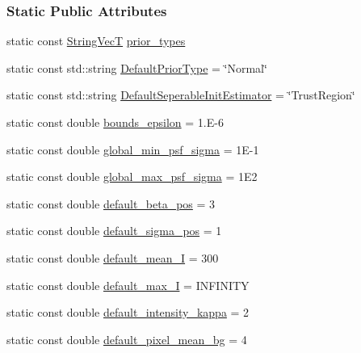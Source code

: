 \subsubsection*{Static Public Attributes}
\begin{DoxyCompactItemize}
\item 
static const \hyperlink{namespacemappel_aae88cf18bccfbb789a6019bcfbbfca68}{String\+VecT} \hyperlink{classmappel_1_1Gauss2DsModel_a9c23ad32b75a80271a0d5ac24138c5ee}{prior\+\_\+types}
\item 
static const std\+::string \hyperlink{classmappel_1_1Gauss2DsModel_ac00cce582449c74c64f624ec85c9e164}{Default\+Prior\+Type} = \char`\"{}Normal\char`\"{}
\item 
static const std\+::string \hyperlink{classmappel_1_1PointEmitterModel_ad8c3dc629d75d22f25855a5f1ba8729f}{Default\+Seperable\+Init\+Estimator} = \char`\"{}Trust\+Region\char`\"{}
\item 
static const double \hyperlink{classmappel_1_1PointEmitterModel_ac987a119137b85a27704b1c40e3fab8c}{bounds\+\_\+epsilon} = 1.\+E-\/6
\item 
static const double \hyperlink{classmappel_1_1PointEmitterModel_a77d0ca98d77cb8b94117ece2a5b182a4}{global\+\_\+min\+\_\+psf\+\_\+sigma} = 1\+E-\/1
\item 
static const double \hyperlink{classmappel_1_1PointEmitterModel_a5e79dba8966c25c4e9c675cd1a2cab70}{global\+\_\+max\+\_\+psf\+\_\+sigma} = 1\+E2
\item 
static const double \hyperlink{classmappel_1_1PointEmitterModel_a9b64c3b4b97ac2805340c0779c71398c}{default\+\_\+beta\+\_\+pos} = 3
\item 
static const double \hyperlink{classmappel_1_1PointEmitterModel_aa98a73b9e3937c00b07596d3928df3ca}{default\+\_\+sigma\+\_\+pos} = 1
\item 
static const double \hyperlink{classmappel_1_1PointEmitterModel_a575dd30a0afb886db82ac725c8cc8df3}{default\+\_\+mean\+\_\+I} = 300
\item 
static const double \hyperlink{classmappel_1_1PointEmitterModel_acca80757a9a285a9e6eedea167d038c7}{default\+\_\+max\+\_\+I} = I\+N\+F\+I\+N\+I\+TY
\item 
static const double \hyperlink{classmappel_1_1PointEmitterModel_ad1f21ed3be543deed3c78a0494cb2984}{default\+\_\+intensity\+\_\+kappa} = 2
\item 
static const double \hyperlink{classmappel_1_1PointEmitterModel_abe82d75be8586234657a61e2f137a6c8}{default\+\_\+pixel\+\_\+mean\+\_\+bg} = 4
\item 

\end{DoxyCompactItemize}
